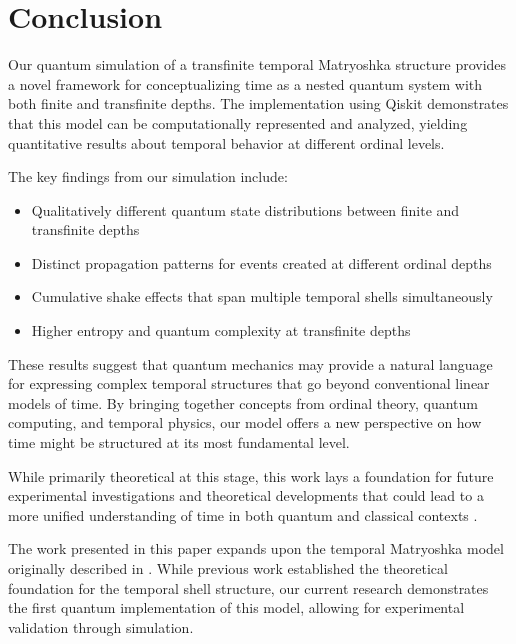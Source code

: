 \documentclass[12pt,a4paper]{article}
\begin{document}
\section{Conclusion}

Our quantum simulation of a transfinite temporal Matryoshka structure provides a novel framework for conceptualizing time as a nested quantum system with both finite and transfinite depths. The implementation using Qiskit demonstrates that this model can be computationally represented and analyzed, yielding quantitative results about temporal behavior at different ordinal levels.

The key findings from our simulation include:

\begin{itemize}
    \item Qualitatively different quantum state distributions between finite and transfinite depths
    \item Distinct propagation patterns for events created at different ordinal depths
    \item Cumulative shake effects that span multiple temporal shells simultaneously
    \item Higher entropy and quantum complexity at transfinite depths
\end{itemize}

These results suggest that quantum mechanics may provide a natural language for expressing complex temporal structures that go beyond conventional linear models of time. By bringing together concepts from ordinal theory, quantum computing, and temporal physics, our model offers a new perspective on how time might be structured at its most fundamental level.

While primarily theoretical at this stage, this work lays a foundation for future experimental investigations and theoretical developments that could lead to a more unified understanding of time in both quantum \citep{nielsen} and classical contexts \citep{barbour, carroll}.

The work presented in this paper expands upon the temporal Matryoshka model originally described in \citep{matryoshka}. While previous work established the theoretical foundation for the temporal shell structure, our current research demonstrates the first quantum implementation of this model, allowing for experimental validation through simulation.



\end{document}
